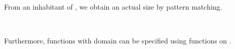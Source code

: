 From an inhabitant of , we obtain an actual size by
pattern matching.
\begin{code}%
\>[0]\AgdaSpace{}%
\AgdaSymbol{:}\AgdaSpace{}%
\AgdaSpace{}%
\AgdaSymbol{\{}\AgdaSymbol{\}}\AgdaSpace{}%
\AgdaSpace{}%
\AgdaSpace{}%
\AgdaSpace{}%
\AgdaSpace{}%
\<%
\\
\>[0]\AgdaSpace{}%
\AgdaOperator{\AgdaInductiveConstructor{[}}\AgdaSpace{}%
\AgdaSpace{}%
\AgdaOperator{\AgdaInductiveConstructor{]}}\AgdaSpace{}%
\AgdaSymbol{=}\AgdaSpace{}%
\<%
\end{code}
Furthermore, functions with domain   can be specified using functions on  .
\begin{code}%
\>[0]\AgdaSpace{}%
\AgdaSymbol{:}\AgdaSpace{}%
\AgdaSymbol{\{}\AgdaSpace{}%
\AgdaSymbol{:}\AgdaSpace{}%
\AgdaSpace{}%
\AgdaSpace{}%
\AgdaSymbol{\}}\AgdaSpace{}%
\AgdaSymbol{\{}\AgdaSpace{}%
\AgdaSymbol{:}\AgdaSpace{}%
\AgdaSymbol{\}}\AgdaSpace{}%
\AgdaSpace{}%
\AgdaSymbol{((}\AgdaSpace{}%
\AgdaSymbol{:}\AgdaSpace{}%
\AgdaSpace{}%
\AgdaSymbol{)}\AgdaSpace{}%
\AgdaSpace{}%
\AgdaSpace{}%
\AgdaSymbol{)}\<%
\\
\>[0][@{}l@{\AgdaIndent{0}}]%
\>[2]\AgdaSpace{}%
\AgdaSymbol{(}\AgdaSpace{}%
\AgdaSymbol{:}\AgdaSpace{}%
\AgdaSpace{}%
\AgdaSymbol{)}\AgdaSpace{}%
\AgdaSpace{}%
\AgdaSpace{}%
\AgdaSymbol{(}\AgdaSpace{}%
\AgdaSymbol{)}\<%
\\
\>[0]\AgdaSpace{}%
\AgdaSpace{}%
\AgdaOperator{\AgdaInductiveConstructor{[}}\AgdaSpace{}%
\AgdaSpace{}%
\AgdaOperator{\AgdaInductiveConstructor{]}}\AgdaSpace{}%
\AgdaSymbol{=}\AgdaSpace{}%
\AgdaSpace{}%
\<%
\end{code}

